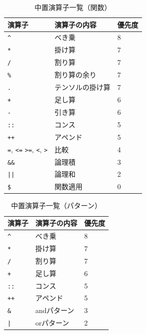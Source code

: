 \begin{table}[h]
\begin{center}
    \begin{tabular}{ | l | l | l |}
    \hline
    演算子 & 演算子の内容 & 優先度 \\ \hline
    \texttt{\^} & べき乗 & 8 \\ \hline
    \texttt{*} & 掛け算 & 7 \\ \hline
    \texttt{/} & 割り算 & 7 \\ \hline
    \texttt{\%} & 割り算の余り & 7 \\ \hline
    \texttt{.} & テンソルの掛け算 & 7 \\ \hline
    \texttt{+} & 足し算 & 6 \\ \hline
    \texttt{-} & 引き算 & 6 \\ \hline
    \texttt{::} & コンス & 5 \\ \hline
    \texttt{++} & アペンド & 5 \\ \hline
    \texttt{=}, \texttt{<=} \texttt{>=}, \texttt{<}, \texttt{>} & 比較 & 4 \\ \hline
    \texttt{\&\&} & 論理積 & 3 \\ \hline
    \texttt{||} & 論理和 & 2 \\ \hline
    \texttt{\$} & 関数適用 & 0 \\ \hline
    \end{tabular}
\end{center}
    \caption{中置演算子一覧（関数）}
    \label{tab:infixFunctions}
\end{table}

\begin{table}[h]
\begin{center}
    \begin{tabular}{ | l | l | l |}
    \hline
    演算子 & 演算子の内容 & 優先度 \\ \hline
    \texttt{\^} & べき乗 & 8 \\ \hline
    \texttt{*} & 掛け算 & 7 \\ \hline
    \texttt{/} & 割り算 & 7 \\ \hline
    \texttt{+} & 足し算 & 6 \\ \hline
    \texttt{::} & コンス & 5 \\ \hline
    \texttt{++} & アペンド & 5 \\ \hline
    \texttt{\&} & andパターン & 3 \\ \hline
    \texttt{|} & orパターン & 2 \\ \hline
    \end{tabular}
\end{center}
    \caption{中置演算子一覧（パターン）}
    \label{tab:infixPatterns}
\end{table}

